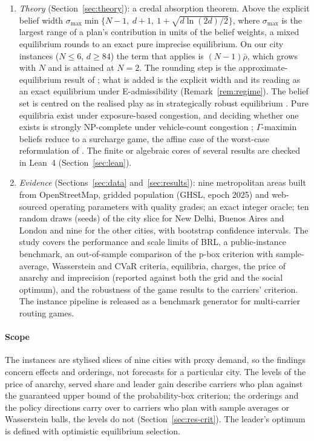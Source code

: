 \documentclass[preprint,12pt]{elsarticle}
\theoremstyle{definition}
\theoremstyle{remark}
\begin{document}
\begin{enumerate}[label=(\roman*),leftmargin=*]
\item \emph{Theory} (Section~\ref{sec:theory}): a credal absorption theorem. Above the explicit belief width $\sigma_{\max}\min\{N-1,\ d+1,\ 1+\sqrt{d\ln(2d)/2}\}$, where $\sigma_{\max}$ is the largest range of a plan's contribution in units of the belief weights, a mixed equilibrium rounds to an exact pure imprecise equilibrium. On our city instances ($N\le6$, $d\ge84$) the term that applies is $(N-1)\bar\rho$, which grows with $N$ and is attained at $N=2$. The rounding step is the approximate-equilibrium result of \citet{Liu2023}; what is added is the explicit width and its reading as an exact equilibrium under E-admissibility (Remark~\ref{rem:regime}). The belief set is centred on the realised play as in strategically robust equilibrium \citep{Lanzetti2025,Feik2026}. Pure equilibria exist under exposure-based congestion, and deciding whether one exists is strongly NP-complete under vehicle-count congestion \citep{Apt2022,Gottlob2005}; $\Gamma$-maximin beliefs reduce to a surcharge game, the affine case of the worst-case reformulation of \citet{Feik2026}. The finite or algebraic cores of several results are checked in Lean~4 (Section~\ref{sec:lean}).
\item \emph{Evidence} (Sections~\ref{sec:data} and~\ref{sec:results}): nine metropolitan areas built from OpenStreetMap, gridded population (GHSL, epoch 2025) and web-sourced operating parameters with quality grades; an exact integer oracle; ten random draws (seeds) of the city slice for New Delhi, Buenos Aires and London and nine for the other cities, with bootstrap confidence intervals. The study covers the performance and scale limits of BRL, a public-instance benchmark, an out-of-sample comparison of the p-box criterion with sample-average, Wasserstein and CVaR criteria, equilibria, charges, the price of anarchy and imprecision (reported against both the grid and the social optimum), and the robustness of the game results to the carriers' criterion. The instance pipeline is released as a benchmark generator for multi-carrier routing games.
\end{enumerate}

\paragraph{Scope} The instances are stylised slices of nine cities with proxy demand, so the findings concern effects and orderings, not forecasts for a particular city. The levels of the price of anarchy, served share and leader gain describe carriers who plan against the guaranteed upper bound of the probability-box criterion; the orderings and the policy directions carry over to carriers who plan with sample averages or Wasserstein balls, the levels do not (Section~\ref{sec:res-crit}). The leader's optimum is defined with optimistic equilibrium selection.
\end{document}
